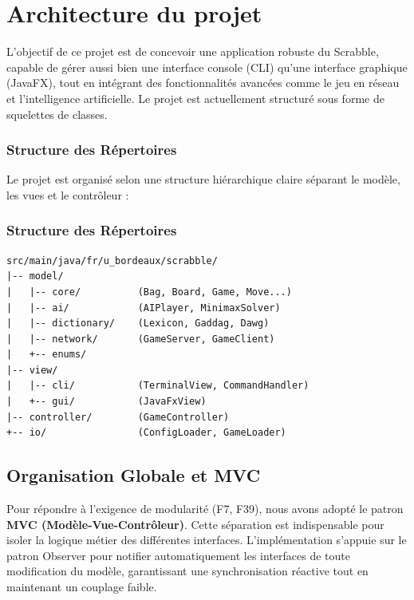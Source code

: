 \documentclass[a4paper]{article}
\begin{document}
\vspace{1\baselineskip}


\section{Architecture du projet}
\hangindent=0.8mm
L’objectif de ce projet est de concevoir une application robuste du Scrabble, capable de gérer aussi bien une interface console (CLI) qu’une interface graphique (JavaFX), tout en intégrant des fonctionnalités avancées comme le jeu en réseau et l’intelligence artificielle. Le projet est actuellement structuré sous forme de squelettes de classes.

\subsubsection{Structure des Répertoires}
\hangindent=0.8mm
Le projet est organisé selon une structure hiérarchique claire séparant le modèle, les vues et le contrôleur :

\subsubsection{Structure des Répertoires}
\begin{verbatim}
src/main/java/fr/u_bordeaux/scrabble/
|-- model/
|   |-- core/          (Bag, Board, Game, Move...)
|   |-- ai/            (AIPlayer, MinimaxSolver)
|   |-- dictionary/    (Lexicon, Gaddag, Dawg)
|   |-- network/       (GameServer, GameClient)
|   +-- enums/
|-- view/
|   |-- cli/           (TerminalView, CommandHandler)
|   +-- gui/           (JavaFxView)
|-- controller/        (GameController)
+-- io/                (ConfigLoader, GameLoader)
\end{verbatim}

\vspace{1\baselineskip}

\subsection{Organisation Globale et MVC}
\hangindent=0.8mm
Pour répondre à l'exigence de modularité (F7, F39), nous avons adopté le patron \textbf{MVC (Modèle-Vue-Contrôleur)}. Cette séparation est indispensable pour isoler la logique métier des différentes interfaces. L'implémentation s'appuie sur le patron Observer pour notifier automatiquement les interfaces de toute modification du modèle, garantissant une synchronisation réactive tout en maintenant un couplage faible.
\end{document}
